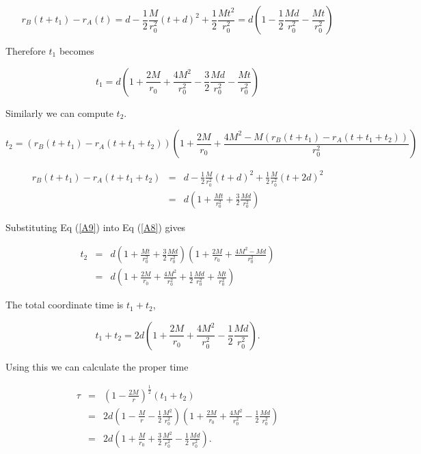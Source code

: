 \documentclass[aps,showpacs,onecolumn,floats,prd,superscriptaddress,nofootinbib]{revtex4-1}
\begin{document}
\begin{equation}
	r_B(t + t_1) - r_A(t) = d - \frac{1}{2} \frac{M}{r_0^2}(t + d)^2 + \frac{1}{2} \frac{Mt^2}{r_0^2} = d \left( 1 - \frac{1}{2} \frac{Md}{r_0^2} - \frac{Mt}{r_0^2} \right)
\end{equation}

Therefore $t_1$ becomes

\begin{equation}
	t_1 = d \left( 1 + \frac{2M}{r_0} + \frac{4M^2}{r_0^2} - \frac{3}{2} \frac{Md}{r_0^2} - \frac{Mt}{r_0^2} \right)
\end{equation}

Similarly we can compute $t_2$.

\begin{equation}
	t_2 = (r_B(t + t_1) - r_A(t+t_1 +t_2)) \left( 1 + \frac{2M}{r_0} + \frac{4M^2 - M (r_B(t + t_1) - r_A(t+t_1+t_2))}{r_0^2} \right)	\label{A8}
\end{equation}

\begin{eqnarray}
	r_B(t + t_1) - r_A(t + t_1 + t_2) & = & d - \frac{1}{2} \frac{M}{r_0^2} (t + d)^2 + \frac{1}{2} \frac{M}{r_0^2} (t + 2d)^2	\nonumber	\\
	& = & d \left( 1 + \frac{Mt}{r_0^2} + \frac{3}{2} \frac{Md}{r_0^2} \right) 	\label{A9}
\end{eqnarray}

Substituting Eq (\ref{A9}) into Eq (\ref{A8}) gives 

\begin{eqnarray}
	t_2 & = & d \left( 1 + \frac{Mt}{r_0^2} + \frac{3}{2} \frac{Md}{r_0^2} \right) \left( 1 + \frac{2M}{r_0} + \frac{4M^2 - Md}{r_0^2} \right)\nonumber	\\
	& = & d \left( 1 + \frac{2M}{r_0} + \frac{4M^2}{r_0^2} + \frac{1}{2} \frac{Md}{r_0^2} + \frac{Mt}{r_0^2} \right)
\end{eqnarray}

The total coordinate time is $t_1 + t_2$,

\begin{equation}
	t_1 +t_2 = 2d \left(1 + \frac{2M}{r_0} + \frac{4M^2}{r_0^2} - \frac{1}{2} \frac{Md}{r_0^2}\right).
\end{equation}

Using this we can calculate the proper time

\begin{eqnarray}
	\tau & = &  \left( 1 - \frac{2M}{r} \right)^\frac{1}{2} (t_1 + t_2) 	\nonumber	\\
	& = & 2d \left( 1 - \frac{M}{r} - \frac{1}{2} \frac{M^2}{r_0^2} \right) \left( 1 + \frac{2M}{r_0} + \frac{4M^2}{r_0^2} - \frac{1}{2} \frac{Md}{r_0^2} \right)		\nonumber	\\
	&  = & 2d \left( 1  + \frac{M}{r_0} + \frac{3}{2} \frac{M^2}{r_0^2} - \frac{1}{2} \frac{Md}{r_0^2} \right).	\label{tauini}
\end{eqnarray}



	
	
	
	
	
	
	




\end{document}
